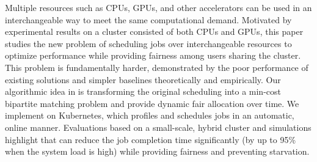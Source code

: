 Multiple resources such as CPUs, GPUs, and other accelerators can be used in an interchangeable way to meet the same computational demand. Motivated by experimental results on a cluster consisted of both CPUs and GPUs, this paper studies the new problem of scheduling jobs over interchangeable resources to optimize performance while providing fairness among users sharing the cluster. This problem is fundamentally harder, demonstrated by the poor performance of existing solutions and simpler baselines theoretically and empirically. 
Our algorithmic idea in \name is transforming the original scheduling into a min-cost bipartite matching problem and provide dynamic fair allocation over time. 
We implement \name on Kubernetes, which profiles and schedules jobs in an automatic, online manner. 
Evaluations based on a small-scale, hybrid cluster and simulations highlight that \name can reduce the job completion time significantly (by up to 95\% when the system load is high) while providing fairness and preventing starvation. 




